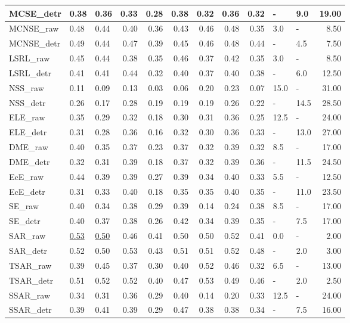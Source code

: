 \begin{tabular}{lllrrrrrrllr}
MCSE\_detr & 0.38 & 0.36 & 0.33 & 0.28 & 0.38 & 0.32 & 0.36 & 0.32 & - & 9.0 & 19.00 \\
\midrule
MCNSE\_raw & 0.48 & 0.44 & 0.40 & 0.36 & 0.43 & 0.46 & 0.48 & 0.35 & 3.0 & - & 8.50 \\
MCNSE\_detr & 0.49 & 0.44 & 0.47 & 0.39 & 0.45 & 0.46 & 0.48 & 0.44 & - & 4.5 & 7.50 \\
\midrule
LSRL\_raw & 0.45 & 0.44 & 0.38 & 0.35 & 0.46 & 0.37 & 0.42 & 0.35 & 3.0 & - & 8.50 \\
LSRL\_detr & 0.41 & 0.41 & 0.44 & 0.32 & 0.40 & 0.37 & 0.40 & 0.38 & - & 6.0 & 12.50 \\
\midrule
NSS\_raw & 0.11 & 0.09 & 0.13 & 0.03 & 0.06 & 0.20 & 0.23 & 0.07 & 15.0 & - & 31.00 \\
NSS\_detr & 0.26 & 0.17 & 0.28 & 0.19 & 0.19 & 0.19 & 0.26 & 0.22 & - & 14.5 & 28.50 \\
\midrule
ELE\_raw & 0.35 & 0.29 & 0.32 & 0.18 & 0.30 & 0.31 & 0.36 & 0.25 & 12.5 & - & 24.00 \\
ELE\_detr & 0.31 & 0.28 & 0.36 & 0.16 & 0.32 & 0.30 & 0.36 & 0.33 & - & 13.0 & 27.00 \\
\midrule
DME\_raw & 0.40 & 0.35 & 0.37 & 0.23 & 0.37 & 0.32 & 0.39 & 0.32 & 8.5 & - & 17.00 \\
DME\_detr & 0.32 & 0.31 & 0.39 & 0.18 & 0.37 & 0.32 & 0.39 & 0.36 & - & 11.5 & 24.50 \\
\midrule
EcE\_raw & 0.44 & 0.39 & 0.39 & 0.27 & 0.39 & 0.34 & 0.40 & 0.33 & 5.5 & - & 12.50 \\
EcE\_detr & 0.31 & 0.33 & 0.40 & 0.18 & 0.35 & 0.35 & 0.40 & 0.35 & - & 11.0 & 23.50 \\
\midrule
SE\_raw & 0.40 & 0.34 & 0.38 & 0.29 & 0.39 & 0.14 & 0.24 & 0.38 & 8.5 & - & 17.00 \\
SE\_detr & 0.40 & 0.37 & 0.38 & 0.26 & 0.42 & 0.34 & 0.39 & 0.35 & - & 7.5 & 17.00 \\
\midrule
SAR\_raw & \underline{0.53} & \underline{0.50} & 0.46 & 0.41 & 0.50 & 0.50 & 0.52 & 0.41 & 0.0 & - & 2.00 \\
SAR\_detr & 0.52 & 0.50 & 0.53 & 0.43 & 0.51 & 0.51 & 0.52 & 0.48 & - & 2.0 & 3.00 \\
\midrule
TSAR\_raw & 0.39 & 0.45 & 0.37 & 0.30 & 0.40 & 0.52 & 0.46 & 0.32 & 6.5 & - & 13.00 \\
TSAR\_detr & 0.51 & 0.52 & 0.52 & 0.40 & 0.47 & 0.53 & 0.49 & 0.46 & - & 2.0 & 2.50 \\
\midrule
SSAR\_raw & 0.34 & 0.31 & 0.36 & 0.29 & 0.40 & 0.14 & 0.20 & 0.33 & 12.5 & - & 24.00 \\
SSAR\_detr & 0.39 & 0.41 & 0.39 & 0.29 & 0.47 & 0.38 & 0.38 & 0.34 & - & 7.5 & 16.00 \\
\midrule
\bottomrule
\end{tabular}
\midrule
